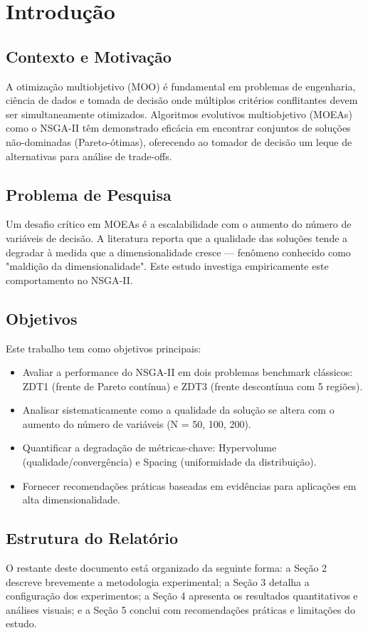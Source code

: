 \section{Introdução}

\subsection{Contexto e Motivação}
A otimização multiobjetivo (MOO) é fundamental em problemas de engenharia, ciência de dados e tomada de decisão onde múltiplos critérios conflitantes devem ser simultaneamente otimizados. Algoritmos evolutivos multiobjetivo (MOEAs) como o NSGA-II têm demonstrado eficácia em encontrar conjuntos de soluções não-dominadas (Pareto-ótimas), oferecendo ao tomador de decisão um leque de alternativas para análise de trade-offs.

\subsection{Problema de Pesquisa}
Um desafio crítico em MOEAs é a escalabilidade com o aumento do número de variáveis de decisão. A literatura reporta que a qualidade das soluções tende a degradar à medida que a dimensionalidade cresce — fenômeno conhecido como "maldição da dimensionalidade". Este estudo investiga empiricamente este comportamento no NSGA-II.

\subsection{Objetivos}
Este trabalho tem como objetivos principais:
\begin{itemize}
  \item Avaliar a performance do NSGA-II em dois problemas benchmark clássicos: ZDT1 (frente de Pareto contínua) e ZDT3 (frente descontínua com 5 regiões).
  \item Analisar sistematicamente como a qualidade da solução se altera com o aumento do número de variáveis (N = 50, 100, 200).
  \item Quantificar a degradação de métricas-chave: Hypervolume (qualidade/convergência) e Spacing (uniformidade da distribuição).
  \item Fornecer recomendações práticas baseadas em evidências para aplicações em alta dimensionalidade.
\end{itemize}

\subsection{Estrutura do Relatório}
O restante deste documento está organizado da seguinte forma: a Seção 2 descreve brevemente a metodologia experimental; a Seção 3 detalha a configuração dos experimentos; a Seção 4 apresenta os resultados quantitativos e análises visuais; e a Seção 5 conclui com recomendações práticas e limitações do estudo.